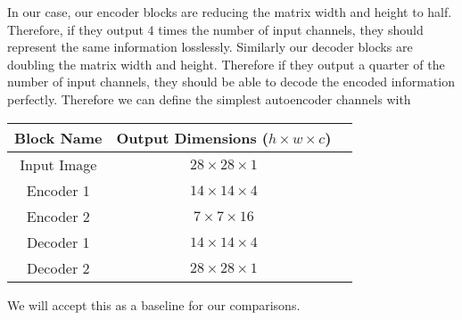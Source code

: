 In our case, our encoder blocks are reducing the matrix width and height to half. Therefore, if they output $4$ times the number of input channels, they should represent the same information losslessly. Similarly our decoder blocks are doubling the matrix width and height. Therefore if they output a quarter of the number of input channels, they should be able to decode the encoded information perfectly. Therefore we can define the simplest autoencoder channels with
\begin{center}
\begin{tabular}{ c | c c }
 Block Name & Output Dimensions ($h \times w \times c$) \\
 \hline
 Input Image & $28 \times 28 \times 1$ \\
 Encoder 1 & $14 \times 14 \times 4$ \\  
 Encoder 2 & $7 \times 7 \times 16$ \\
 Decoder 1 & $14 \times 14 \times 4$ \\  
 Decoder 2 & $28 \times 28 \times 1$ 
\end{tabular}
\end{center}
We will accept this as a baseline for our comparisons. 













































